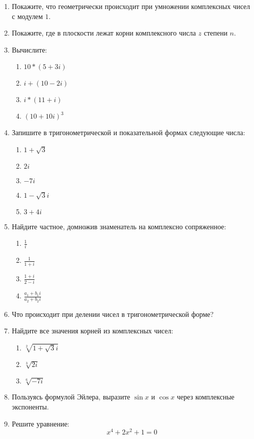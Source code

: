 \documentclass[a4paper,twocolumn,12pt]{article}			%
\begin{document}
	\begin{enumerate}
		\item Покажите, что геометрически происходит при умножении комплексных чисел с модулем $1$.
		\item Покажите, где в плоскости лежат корни комплексного числа $z$ степени $n$.
		\item Вычислите:
		\begin{enumerate}
			\item $10 * (5 + 3i)$
			\item $i + (10 -2i)$
			\item $i * (11 + i)$
			\item $(10+10i)^3$
		\end{enumerate}
	
		\item Запишите в тригонометрической и показательной формах следующие числа:
		\begin{enumerate}
			\item $1 + \sqrt{3}$
			\item $2i$
			\item $-7i$
			\item $1-\sqrt{3}i$
			\item $3 + 4i$
		\end{enumerate}
	
		\item Найдите частное, домножив знаменатель на комплексно сопряженное:
		\begin{enumerate}
			\item $\frac{1}{i}$
			\item $\frac{1}{1 + i}$
			\item $\frac{1 + i}{2 - i}$
			\item $\frac{a_1 + b_1i}{a_2 + b_2 i}$
		\end{enumerate}
		\item Что происходит при делении чисел в тригонометрической форме?
		\item Найдите все значения корней из комплексных чисел:
		\begin{enumerate}
			\item $\sqrt[2]{1 + \sqrt{3}i}$
			\item $\sqrt[3]{2i}$
			\item $\sqrt[6]{-7i}$
		\end{enumerate}
		\item Пользуясь формулой Эйлера, выразите $\sin x$ и $\cos x$ через комплексные экспоненты.
		\item Решите уравнение: $$x^4 + 2x^2 + 1 = 0$$
	\end{enumerate}
\end{document}
